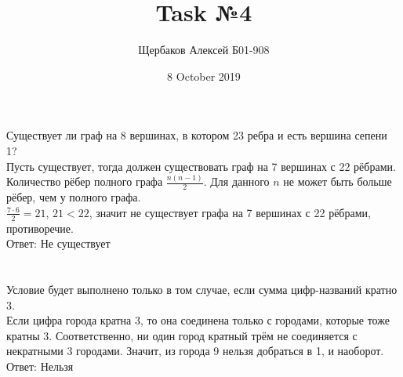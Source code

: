 \documentclass{article}
\title{Task №4}
\author{Щербаков Алексей Б01-908}
\date{8 October 2019}
\begin{document}
\maketitle
\section{}
Существует ли граф на 8 вершинах, в котором 23 ребра и есть вершина сепени 1?
\\
Пусть существует, тогда должен существовать граф на 7 вершинах с 22 рёбрами.\\ Количество рёбер полного графа $\frac{n(n-1)}{2}$. Для данного $n$ не может быть больше рёбер, чем у полного графа.\\ $\frac{7\cdot6}{2}=21$, $21<22$, значит не существует графа на 7 вершинах с 22 рёбрами, противоречие.
\\Ответ: Не существует
\section{}
Условие будет выполнено только в том случае, если сумма цифр-названий кратно 3.\\
Если цифра города кратна 3, то она соединена только с городами, которые тоже кратны 3. Соответственно, ни один город кратный трём не соединяется с некратными 3 городами. Значит, из города 9 нельзя добраться в 1, и наоборот.\\
Ответ: Нельзя
\end{document}
